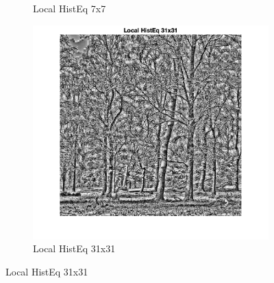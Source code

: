 \documentclass[12pt]{article}
\begin{document}
\begin{figure}[h!]
\begin{subfigure}[b]{0.3\textwidth}
            \caption{Local HistEq 7x7}
        \end{subfigure}
        \hfill
        \begin{subfigure}[b]{0.3\textwidth}
            \centering
            \includegraphics[width=\textwidth]{../images/LC2_localHistEq_31x31.png}
            \caption{Local HistEq 31x31}
        \end{subfigure}
        
        \vspace{10pt} %
        

\end{figure}
\end{document}
